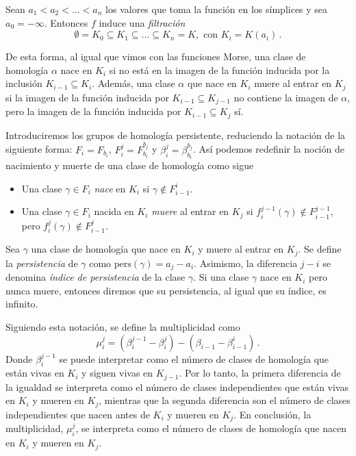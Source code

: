 \begin{definition}
Sean $a_1 < a_2 < ... < a_n$ los valores que toma la función en los símplices y sea $a_0 = -\infty$. Entonces $f$ induce una \emph{filtración}
\[
\emptyset = K_0 \subseteq K_1 \subseteq ... \subseteq K_n = K, \text{ con } K_i=K(a_i)\,.
\]
\end{definition}

De esta forma, al igual que vimos con las funciones Morse, una clase de homología $\alpha$ nace en $K_i$ si no está en la imagen de la función inducida por la inclusión $K_{i-1} \subseteq K_i$. Además, una clase $\alpha$ que nace en $K_i$ muere al entrar en $K_j$ si la imagen de la función inducida por $K_{i-1} \subseteq K_{j-1}$ no contiene la imagen de $\alpha$, pero la imagen de la función inducida por $K_{i-1} \subseteq K_j$ sí.

Introduciremos los grupos de homología persistente, reduciendo la notación de la siguiente forma: $F_i = F_{b_i}$, $F_{i}^{j}=F_{b_i}^{b_j}$ y $\beta_{i}^{j}=\beta_{b_i}^{b_j}$. Así podemos redefinir la noción de nacimiento y muerte de una clase de homología como sigue
\begin{itemize}
	\item Una clase $\gamma \in F_i$ \emph{nace} en $K_i$ si $\gamma \notin F_{i-1}^{i}$.
	\item Una clase $\gamma \in F_i$ nacida en $K_i$ \emph{muere} al entrar en $K_j$ si $f_{i}^{j-1}(\gamma)\notin F_{i-1}^{j-1}$, pero $f_{i}^{j}(\gamma)\notin F_{i-1}^{j}$. 
\end{itemize} 

\begin{definition}
Sea $\gamma$ una clase de homología que nace en $K_i$ y muere al entrar en $K_j$. Se define la \emph{persistencia} de $\gamma$ como $\text{pers}(\gamma)= a_j - a_i$. Asimismo, la diferencia $j-i$ se denomina \emph{índice de persistencia} de la clase $\gamma$. Si una clase $\gamma$ nace en $K_i$ pero nunca muere, entonces diremos que su persistencia, al igual que su índice, es infinito.
\end{definition}

Siguiendo esta notación, se define la multiplicidad como
\[
\mu_{i}^{j} = (\beta_{i}^{j-1}-\beta_{i}^{j})-(\beta_{i-1}-\beta_{i-1}^{i})\,.
\]
Donde $\beta_{i}^{j-1}$ se puede interpretar como el número de clases de homología que están vivas en $K_i$ y siguen vivas en $K_{j-1}$. Por lo tanto, la primera diferencia de la igualdad se interpreta como el número de clases independientes que están vivas en $K_i$ y mueren en $K_j$, mientras que la segunda diferencia son el número de clases independientes que nacen antes de $K_i$ y mueren en $K_j$. En conclusión, la multiplicidad, $\mu_{i}^{j}$, se interpreta como el número de clases de homología que nacen en $K_i$ y mueren en $K_j$.

